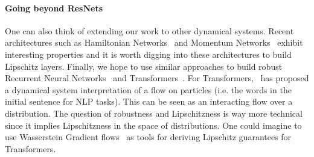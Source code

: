\paragraph{Going beyond ResNets} One can also think of extending  our work to  other dynamical systems. Recent architectures such as Hamiltonian Networks~\citep{greydanus2019hamiltonian} and Momentum Networks~\citep{sander2021momentum} exhibit interesting properties and it is worth digging into these architectures to build Lipschitz layers.
Finally, we hope to use similar approaches to build robust Recurrent Neural Networks~\citep{sherstinsky2020fundamentals} and Transformers~\citep{vaswani2017attention}. For Transformers,~\citet{vuckovic2020mathematical,sander2021sinkformers} has proposed a dynamical system interpretation of a flow on particles (i.e. the words in the  initial sentence for NLP tasks). This can be seen as an interacting flow over a distribution. The question of robustness and Lipschitzness is way more technical since it implies Lipschitzness in the space of distributions. One could imagine to use Wasserstein Gradient flows~\citep{ambrosio2005gradient} as tools for deriving Lipschitz guarantees for Transformers.


